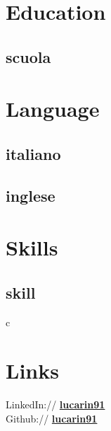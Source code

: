 \documentclass[a4paper]{deedy-resume} %
\begin{document}
\begin{minipage}[t]{0.33\textwidth} %




\section{Education}
  \subsection{scuola}

  \sectionspace %


\section{Language}

\subsection{italiano}
  \subsection{inglese}
  \sectionspace %


\section{Skills}
  \subsection{skill}
    c \textbullet{}
\sectionspace %


\section{Links}

LinkedIn:// \href{https://www.linkedin.com/in/lucarin91}{\bf lucarin91} \\
Github:// \href{https://github.com/lucarin91}{\bf lucarin91} \\
\sectionspace %


\end{minipage} %
\end{document}
